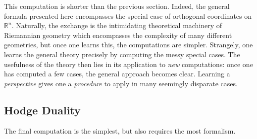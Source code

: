 \documentclass[12pt,letterpaper,boxed]{jhwhw}
\newcommand{\R}{{\mathbb{R}}}
\begin{document}
This computation is shorter than the previous section. Indeed, the general formula presented here encompasses the special case of orthogonal coordinates on $\R^n$. Naturally, the exchange is the intimidating theoretical machinery of Riemannian geometry which encompasses the complexity of many different geometries, but once one learns this, the computations are simpler. Strangely, one learns the general theory precisely by computing the messy special cases. The usefulness of the theory then lies in its application to \textit{new} computations: once one has computed a few cases, the general approach becomes clear. Learning a \textit{perspective} gives one a \textit{procedure} to apply in many seemingly disparate cases.

\subsection{Hodge Duality}
The final computation is the simplest, but also requires the most formalism. 
\end{document}
